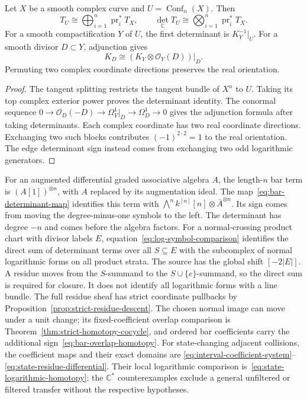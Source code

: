 \begin{proposition}
\label{prop:det-config}
Let $X$ be a smooth complex curve and $U=\operatorname{Conf}_n(X)$.
Then
\[
T_U\cong\bigoplus_{i=1}^n\operatorname{pr}_i^*T_X,
\qquad
\det_{\mathbb C}T_U\cong\bigotimes_{i=1}^n\operatorname{pr}_i^*T_X.
\]
For a smooth compactification $Y$ of $U$, the first determinant is $K_Y^{-1}|_U$.
For a smooth divisor $D\subset Y$, adjunction gives
\[
K_D\cong(K_Y\otimes\mathcal O_Y(D))|_D.
\]
Permuting two complex coordinate directions preserves the real orientation.
\end{proposition}
\begin{proof}
The tangent splitting restricts the tangent bundle of $X^n$ to $U$.
Taking its top complex exterior power proves the determinant identity.
The conormal sequence
$0\to\mathcal O_D(-D)\to\Omega_Y^1|_D\to\Omega_D^1\to0$
gives the adjunction formula after taking determinants.
Each complex coordinate has two real coordinate directions.
Exchanging two such blocks contributes $(-1)^{2\cdot2}=1$ to the real orientation.
The edge determinant sign instead comes from exchanging two odd logarithmic generators.
\end{proof}

\begin{construction}
\label{constr:det-bar}
For an augmented differential graded associative algebra $A$, the length-$n$ bar term is
$(A[1])^{\otimes n}$, with $A$ replaced by its augmentation ideal.
The map~\eqref{eq:bar-determinant-map} identifies this term with
$\bigwedge^n k^{[n]}[n]\otimes\bar A^{\otimes n}$.
Its sign comes from moving the degree-minus-one symbols to the left.
The determinant has degree $-n$ and comes before the algebra factors.
For a normal-crossing product chart with divisor labels $E$,
equation~\eqref{eq:log-symbol-comparison} identifies the direct sum of determinant terms over all $S\subseteq E$
with the subcomplex of normal logarithmic forms on all product strata.
The source has the global shift $[-2|E|]$.
A residue moves from the $S$-summand to the $S\cup\{e\}$-summand, so the direct sum is required for closure.
It does not identify all logarithmic forms with a line bundle.
The full residue sheaf has strict coordinate pullbacks by Proposition~\ref{prop:strict-residue-descent}.
The chosen normal image can move under a unit change; its fixed-coefficient overlap comparison is
Theorem~\ref{thm:strict-homotopy-cocycle}, and ordered bar coefficients carry the additional sign~\eqref{eq:bar-overlap-homotopy}.
For state-changing adjacent collisions, the coefficient maps and their exact domains are
\eqref{eq:interval-coefficient-system}--\eqref{eq:state-residue-differential}.
Their local logarithmic comparison is~\eqref{eq:state-logarithmic-homotopy}; the $\mathbb C^*$ counterexamples exclude a general unfiltered or filtered transfer without the respective hypotheses.
\end{construction}


